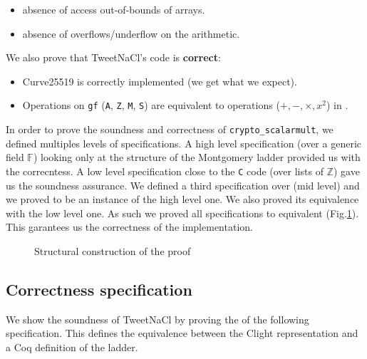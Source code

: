 \begin{itemize}
\item absence of access out-of-bounds of arrays.
\item absence of overflows/underflow on the arithmetic.
\end{itemize}

\noindent
We also prove that TweetNaCl's code is \textbf{correct}:

\begin{itemize}
\item Curve25519 is correctly implemented (we get what we expect).
\item Operations on \texttt{gf} (\texttt{A}, \texttt{Z}, \texttt{M}, \texttt{S})
are equivalent to operations ($+,-,\times,x^2$) in \Zfield.
\end{itemize}

In order to prove the soundness and correctness of \texttt{crypto\_scalarmult},
we defined multiples levels of specifications.
A high level specification (over a generic field $\mathbb{F}$) looking only at
the structure of the Montgomery ladder provided us with the correcntess.
A low level specification close to the \texttt{C} code (over lists of $\mathbb{Z}$)
gave us the soundness assurance.
We defined a third specification over \Zfield (mid level) and
we proved to be an instance of the high level one.
We also proved its equivalence with the low level one.
As such we proved all specifications to equivalent (Fig.\ref{tk:ProofStructure}).
This garantees us the correctness of the
implementation.

\begin{figure}[h]
  
  \caption{Structural construction of the proof}
  \label{tk:ProofStructure}
\end{figure}

\subsection{Correctness specification}

We show the soundness of TweetNaCl by proving the {} of the following
specification. This defines the equivalence between the Clight representation
and a Coq definition of the ladder.

